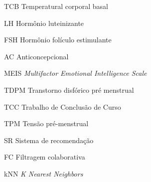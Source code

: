 \begin{siglas}
  \item[TCB] Temperatural corporal basal
  \item[LH] Hormônio luteinizante
  \item[FSH] Hormônio folículo estimulante
  \item[AC] Anticoncepcional
  \item[MEIS] \textit{Multifactor Emotional Intelligence Scale}
  \item[TDPM] Transtorno disfórico pré menstrual 
  \item[TCC] Trabalho de Conclusão de Curso
  \item[TPM] Tensão pré-menstrual  
  \item[SR] Sistema de recomendação
  \item[FC] Filtragem colaborativa
  \item[kNN] \textit{K Nearest Neighbors}
\end{siglas}
